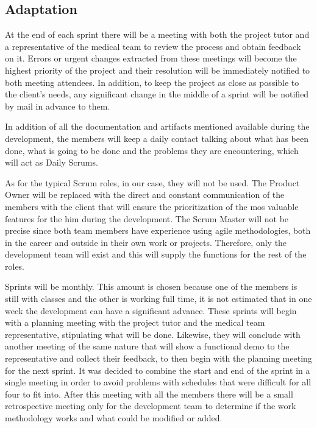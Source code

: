      \subsection{Adaptation}
    
    At the end of each sprint there will be a meeting with both the project tutor and a representative of the medical team to review the process and obtain feedback on it. Errors or urgent changes extracted from these meetings will become the highest priority of the project and their resolution will be immediately notified to both meeting attendees. In addition, to keep the project as close as possible to the client's needs, any significant change in the middle of a sprint will be notified by mail in advance to them.\newline
    
    In addition of all the documentation and artifacts mentioned available during the development, the members will keep a daily contact talking about what has been done, what is going to be done and the problems they are encountering, which will act as Daily Scrums.\newline
	
	As for the typical Scrum roles, in our case, they will not be used. The Product Owner will be replaced with the direct and constant communication of the members with the client that will ensure the prioritization of the mos valuable features for the him during the development. The Scrum Master will not be precise since both team members have experience using agile methodologies, both in the career and outside in their own work or projects. Therefore, only the development team will exist and this will supply the functions for the rest of the roles.\newline
	
	Sprints will be monthly. This amount is chosen because one of the members is still with classes and the other is working full time, it is not estimated that in one week the development can have a  significant advance. These sprints will begin with a planning meeting with the project tutor and the medical team representative, stipulating what will be done. Likewise, they will conclude with another meeting of the same nature that will show a functional demo to the representative and collect their feedback, to then begin with the planning meeting for the next sprint. It was decided to combine the start and end of the sprint in a single meeting in order to avoid problems with schedules that were difficult for all four to fit into. After this meeting with all the members there will be a small retrospective meeting only for the development team to determine if the work methodology works and what could be modified or added.